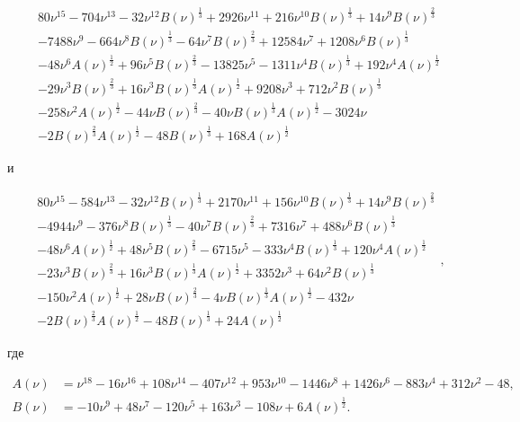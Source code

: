 \begin{equation}
  \begin{aligned}
    & 80 \nu^{15} - 704 \nu^{13} - 32 \nu^{12} B(\nu)^{\frac{1}{3}} + 2926 \nu^{11} + 216 \nu^{10} B(\nu)^{\frac{1}{3}} + 14 \nu^{9} B(\nu)^{\frac{2}{3}} \\
    & - 7488 \nu^{9} - 664 \nu^{8} B(\nu)^{\frac{1}{3}} - 64 \nu^{7} B(\nu)^{\frac{2}{3}} + 12584 \nu^{7} + 1208 \nu^{6} B(\nu)^{\frac{1}{3}} \\
    & - 48 \nu^{6} A(\nu)^{\frac{1}{2}} + 96 \nu^{5} B(\nu)^{\frac{2}{3}} - 13825 \nu^{5} - 1311 \nu^{4} B(\nu)^{\frac{1}{3}} + 192 \nu^{4} A(\nu)^{\frac{1}{2}} \\
    & - 29 \nu^{3} B(\nu)^{\frac{2}{3}} + 16 \nu^{3} B(\nu)^{\frac{1}{3}} A(\nu)^{\frac{1}{2}} + 9208 \nu^{3} + 712 \nu^{2} B(\nu)^{\frac{1}{3}} \\
    & - 258 \nu^{2} A(\nu)^{\frac{1}{2}} - 44 \nu B(\nu)^{\frac{2}{3}} - 40 \nu B(\nu)^{\frac{1}{3}} A(\nu)^{\frac{1}{2}} - 3024 \nu \\
    & - 2 B(\nu)^{\frac{2}{3}} A(\nu)^{\frac{1}{2}} - 48 B(\nu)^{\frac{1}{3}} + 168 A(\nu)^{\frac{1}{2}}
  \end{aligned}
\end{equation}

и

\begin{equation}
  \begin{aligned}
    & 80 \nu^{15} - 584 \nu^{13} - 32 \nu^{12} B(\nu)^{\frac{1}{3}} + 2170 \nu^{11} + 156 \nu^{10} B(\nu)^{\frac{1}{3}} + 14 \nu^{9} B(\nu)^{\frac{2}{3}} \\
    & - 4944 \nu^{9} - 376 \nu^{8} B(\nu)^{\frac{1}{3}} - 40 \nu^{7} B(\nu)^{\frac{2}{3}} + 7316 \nu^{7} + 488 \nu^{6} B(\nu)^{\frac{1}{3}} \\
    & - 48 \nu^{6} A(\nu)^{\frac{1}{2}} + 48 \nu^{5} B(\nu)^{\frac{2}{3}} - 6715 \nu^{5} - 333 \nu^{4} B(\nu)^{\frac{1}{3}} + 120 \nu^{4} A(\nu)^{\frac{1}{2}} \\
    & - 23 \nu^{3} B(\nu)^{\frac{2}{3}} + 16 \nu^{3} B(\nu)^{\frac{1}{3}} A(\nu)^{\frac{1}{2}} + 3352 \nu^{3} + 64 \nu^{2} B(\nu)^{\frac{1}{3}} \\
    & - 150 \nu^{2} A(\nu)^{\frac{1}{2}} + 28 \nu B(\nu)^{\frac{2}{3}} - 4 \nu B(\nu)^{\frac{1}{3}} A(\nu)^{\frac{1}{2}} - 432 \nu \\
    & - 2 B(\nu)^{\frac{2}{3}} A(\nu)^{\frac{1}{2}} - 48 B(\nu)^{\frac{1}{3}} + 24 A(\nu)^{\frac{1}{2}}
  \end{aligned},
\end{equation}

где

\begin{align*}
  A(\nu) &= \nu^{18} - 16 \nu^{16} + 108 \nu^{14} - 407 \nu^{12} + 953 \nu^{10} - 1446 \nu^{8} + 1426 \nu^{6} - 883 \nu^{4} + 312 \nu^{2} - 48, \\
  B(\nu) &= - 10 \nu^{9} + 48 \nu^{7} - 120 \nu^{5} + 163 \nu^{3} - 108 \nu + 6 A(\nu)^{\frac{1}{2}}.
\end{align*}
